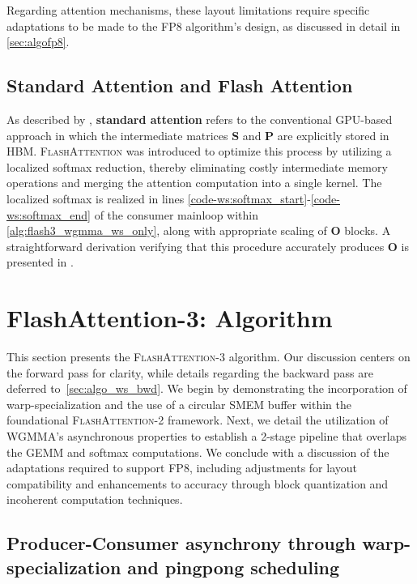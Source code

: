 Regarding attention mechanisms, these layout limitations require specific adaptations to be made to the FP8 algorithm’s design, as discussed in detail in \cref{sec:algofp8}.

\subsection{Standard Attention and Flash Attention} As described by \citet{dao2022flashattention}, \textbf{standard attention} refers to the conventional GPU-based approach in which the intermediate matrices $\mathbf{S}$ and $\mathbf{P}$ are explicitly stored in HBM. \textsc{FlashAttention} was introduced to optimize this process by utilizing a localized softmax reduction, thereby eliminating costly intermediate memory operations and merging the attention computation into a single kernel. The localized softmax is realized in lines \ref{code-ws:softmax_start}-\ref{code-ws:softmax_end} of the consumer mainloop within \cref{alg:flash3_wgmma_ws_only}, along with appropriate scaling of $\mathbf{O}$ blocks. A straightforward derivation verifying that this procedure accurately produces $\mathbf{O}$ is presented in \cite[\S 2.3.1]{dao2023flashattention2}.

\section{FlashAttention-3: Algorithm}
\label{sec:algo}

This section presents the \textsc{FlashAttention-3} algorithm. Our discussion centers on the forward pass for clarity, while details regarding the backward pass are deferred to~\cref{sec:algo_ws_bwd}. We begin by demonstrating the incorporation of warp-specialization and the use of a circular SMEM buffer within the foundational \textsc{FlashAttention-2} framework. Next, we detail the utilization of WGMMA’s asynchronous properties to establish a 2-stage pipeline that overlaps the GEMM and softmax computations. We conclude with a discussion of the adaptations required to support FP8, including adjustments for layout compatibility and enhancements to accuracy through block quantization and incoherent computation techniques.

\subsection{Producer-Consumer asynchrony through warp-specialization and pingpong scheduling}
\label{sec:algo_ws}

